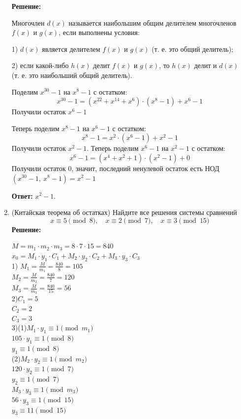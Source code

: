 \documentclass[]{book}
\theoremstyle{definition}
\begin{document}
\begin{enumerate}
\textbf{Решение:}

Многочлен $d(x)$ называется наибольшим общим делителем многочленов $f(x)$ и $g(x)$, если выполнены условия:

1)	$d(x)$ является делителем $f(x)$ и $g(x)$ (т. е. это общий делитель);

2)	если какой-либо $h(x)$ делит $f(x)$ и $g(x)$, то $h(x)$ делит и $d(x)$ (т. е. это наибольший общий делитель).

Поделим $x^{30} -1$ на $x^8 - 1$ с остатком:
$$x^{30} - 1 = (x^{22} + x^{14} + x^6)\cdot (x^8 - 1) + x^6 - 1$$
Получили остаток $x^6 - 1$

Теперь поделим $x^8 - 1$ на $x^6 - 1$ с остатком:
$$x^8 - 1 = x^2\cdot(x^6 - 1) + x^2 - 1$$
Получили остаток $x^2 - 1$.
Теперь поделим $x^6 - 1$ на $x^2 - 1$ с остатком:
$$x^6 - 1 = (x^4 + x^2 + 1)\cdot(x^2 - 1) + 0$$
Получили остаток 0, значит, последний ненулевой остаток есть НОД$(x^{30} - 1,\: x^8 - 1) = x^2 - 1$

\textbf{Ответ:} $x^2 - 1$.


\item (Китайская теорема об остатках) Найдите все решения системы сравнений 
$$x \equiv 5 \pmod{8}, \quad x \equiv 2 \pmod{7}, \quad x \equiv 3 \pmod{15} $$
\textbf{Решение:}


$M = m_1\cdot m_2\cdot m_3 = 8\cdot 7\cdot 15 = 840$\\
$x_0 = M_1\cdot y_1\cdot C_1 + M_2\cdot y_2\cdot C_2 + M_3\cdot y_3\cdot C_3$ \\

1) $M_1 = \frac{M}{m_1} = \frac{840}{8} = 105$\\
$M_2 = \frac{M}{m_2} = \frac{840}{7} = 120$\\
$M_3 = \frac{M}{m_3} = \frac{840}{15} = 56$\\

2)$ C_1 = 5$\\
$C_2 = 2$\\
$C_3 = 3$\\

3)(1)$M_1\cdot y_1\equiv 1 \pmod {m_1}$\\
$105\cdot y_1\equiv 1 \pmod {8}$\\
$y_1\equiv 1 \pmod {8}$\\
(2)$M_2\cdot y_2\equiv 1 \pmod {m_2}$\\
$120\cdot y_2\equiv 1 \pmod {7}$\\
$y_2\equiv 1 \pmod {7}$\\
$M_3\cdot y_3\equiv 1 \pmod {m_3}$\\
$56\cdot y_3\equiv 1 \pmod {15}$\\
$y_3\equiv 11 \pmod {15}$\\


\end{enumerate}
\end{document}
